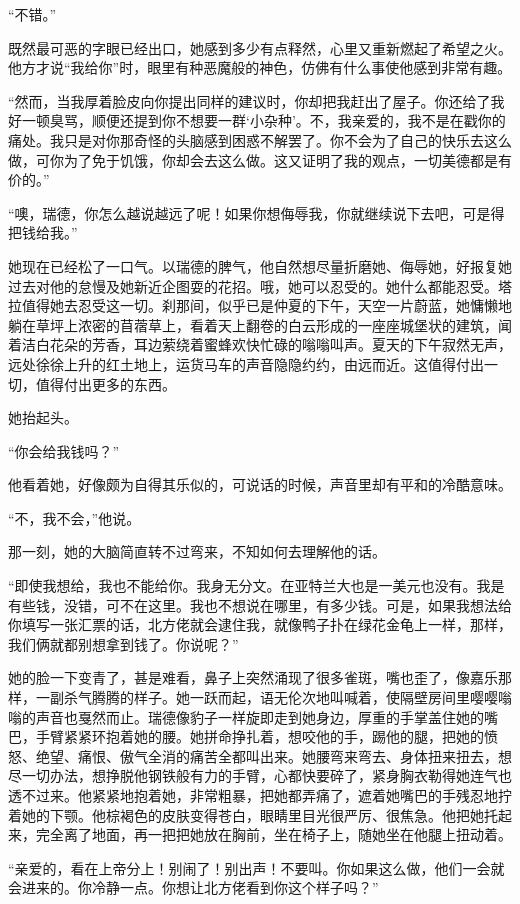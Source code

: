 \par “不错。”
\par 既然最可恶的字眼已经出口，她感到多少有点释然，心里又重新燃起了希望之火。他方才说“我给你”时，眼里有种恶魔般的神色，仿佛有什么事使他感到非常有趣。
\par “然而，当我厚着脸皮向你提出同样的建议时，你却把我赶出了屋子。你还给了我好一顿臭骂，顺便还提到你不想要一群‘小杂种’。不，我亲爱的，我不是在戳你的痛处。我只是对你那奇怪的头脑感到困惑不解罢了。你不会为了自己的快乐去这么做，可你为了免于饥饿，你却会去这么做。这又证明了我的观点，一切美德都是有价的。”
\par “噢，瑞德，你怎么越说越远了呢！如果你想侮辱我，你就继续说下去吧，可是得把钱给我。”
\par 她现在已经松了一口气。以瑞德的脾气，他自然想尽量折磨她、侮辱她，好报复她过去对他的怠慢及她新近企图耍的花招。哦，她可以忍受的。她什么都能忍受。塔拉值得她去忍受这一切。刹那间，似乎已是仲夏的下午，天空一片蔚蓝，她慵懒地躺在草坪上浓密的苜蓿草上，看着天上翻卷的白云形成的一座座城堡状的建筑，闻着洁白花朵的芳香，耳边萦绕着蜜蜂欢快忙碌的嗡嗡叫声。夏天的下午寂然无声，远处徐徐上升的红土地上，运货马车的声音隐隐约约，由远而近。这值得付出一切，值得付出更多的东西。
\par 她抬起头。
\par “你会给我钱吗？”
\par 他看着她，好像颇为自得其乐似的，可说话的时候，声音里却有平和的冷酷意味。
\par “不，我不会，”他说。
\par 那一刻，她的大脑简直转不过弯来，不知如何去理解他的话。
\par “即使我想给，我也不能给你。我身无分文。在亚特兰大也是一美元也没有。我是有些钱，没错，可不在这里。我也不想说在哪里，有多少钱。可是，如果我想法给你填写一张汇票的话，北方佬就会逮住我，就像鸭子扑在绿花金龟上一样，那样，我们俩就都别想拿到钱了。你说呢？”
\par 她的脸一下变青了，甚是难看，鼻子上突然涌现了很多雀斑，嘴也歪了，像嘉乐那样，一副杀气腾腾的样子。她一跃而起，语无伦次地叫喊着，使隔壁房间里嘤嘤嗡嗡的声音也戛然而止。瑞德像豹子一样旋即走到她身边，厚重的手掌盖住她的嘴巴，手臂紧紧环抱着她的腰。她拼命挣扎着，想咬他的手，踢他的腿，把她的愤怒、绝望、痛恨、傲气全消的痛苦全都叫出来。她腰弯来弯去、身体扭来扭去，想尽一切办法，想挣脱他钢铁般有力的手臂，心都快要碎了，紧身胸衣勒得她连气也透不过来。他紧紧地抱着她，非常粗暴，把她都弄痛了，遮着她嘴巴的手残忍地拧着她的下颚。他棕褐色的皮肤变得苍白，眼睛里目光很严厉、很焦急。他把她托起来，完全离了地面，再一把把她放在胸前，坐在椅子上，随她坐在他腿上扭动着。
\par “亲爱的，看在上帝分上！别闹了！别出声！不要叫。你如果这么做，他们一会就会进来的。你冷静一点。你想让北方佬看到你这个样子吗？”
